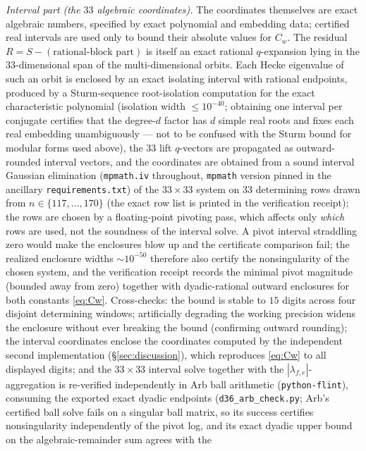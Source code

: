 \documentclass[11pt]{article}
\theoremstyle{remark}
\begin{document}
\emph{Interval part (the $33$ algebraic coordinates).} The coordinates
themselves are exact algebraic numbers, specified by exact polynomial
and embedding data; certified real intervals are used only to bound
their absolute values for $C_w$. The residual
$R=S-(\text{rational-block part})$ is itself an exact rational
$q$-expansion lying in the $33$-dimensional span of the
multi-dimensional orbits. Each Hecke eigenvalue of such an orbit is
enclosed by an exact isolating interval with rational endpoints,
produced by a Sturm-sequence root-isolation computation for the exact
characteristic polynomial (isolation width
$\le10^{-40}$; obtaining one interval per conjugate certifies that the
degree-$d$ factor has $d$ simple real roots and fixes each real
embedding unambiguously --- not to be confused with the Sturm bound for
modular forms used above), the $33$
lift $q$-vectors are propagated as outward-rounded interval vectors,
and the coordinates are obtained from a sound interval Gaussian
elimination (\texttt{mpmath.iv} throughout, \texttt{mpmath} version
pinned in the ancillary \texttt{requirements.txt}) of the $33\times33$
system on $33$ determining rows drawn from $n\in\{117,\dots,170\}$ (the
exact row list is printed in the verification receipt); the rows are
chosen by a floating-point pivoting pass, which affects only
\emph{which} rows are used, not the soundness of the interval solve. A
pivot interval straddling zero would make the enclosures blow up and
the certificate comparison fail; the realized enclosure widths
$\sim10^{-50}$ therefore also certify the nonsingularity of the chosen
system, and the verification receipt records the minimal pivot
magnitude (bounded away from zero) together with dyadic-rational
outward enclosures for both constants \eqref{eq:Cw}. Cross-checks: the
bound is stable to $15$ digits across four disjoint determining
windows; artificially degrading the working precision widens the
enclosure without ever breaking the bound (confirming outward
rounding); the interval coordinates enclose the coordinates
computed by the independent second implementation
(\S\ref{sec:discussion}), which reproduces \eqref{eq:Cw} to all
displayed digits; and the $33\times33$ interval solve together with
the $|\lambda_{f,e}|$-aggregation is re-verified independently in Arb
ball arithmetic (\texttt{python-flint}), consuming the exported exact
dyadic endpoints (\texttt{d36\_arb\_check.py}; Arb's certified ball
solve fails on a singular ball matrix, so its success certifies
nonsingularity independently of the pivot log, and its exact dyadic
upper bound on the algebraic-remainder sum agrees with the
\end{document}
